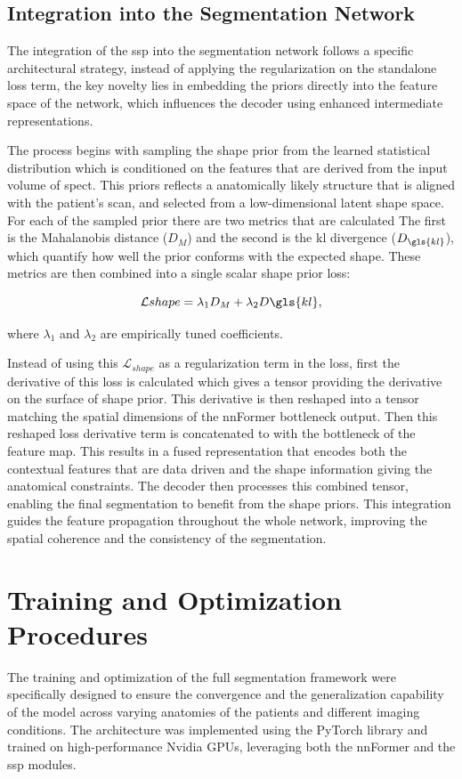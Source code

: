 \subsection{Integration into the Segmentation Network}
The integration of the \gls{ssp} into the segmentation network follows a specific architectural strategy, instead of applying the regularization on the standalone loss term, the key novelty lies in embedding the priors directly into the feature space of the network, which influences the decoder using enhanced intermediate representations. 

The process begins with sampling the shape prior from the learned statistical distribution which is conditioned on the features that are derived from the input volume of \gls{spect}. This priors reflects a anatomically likely structure that is aligned with the patient's scan, and selected from a low-dimensional latent shape space. For each of the sampled prior there are two metrics that are calculated The first is the Mahalanobis distance ($D_M$) and the second is the \gls{kl} divergence ($D_{\gls{kl}}$), which quantify how well the prior conforms with the expected shape. These metrics are then combined into a single scalar shape prior loss:

\begin{equation}
\addcontentsline{equ}{equations}{\protect\numberline{\theequation}Combined Shape Loss} 
\mathcal{L}{shape} = \lambda_1 D_M + \lambda_2 D{\gls{kl}}, 
\end{equation}

where $\lambda_1$ and $\lambda_2$ are empirically tuned coefficients.

Instead of using this $\mathcal{L}_{shape}$ as a regularization term in the loss, first the derivative of this loss is calculated which gives a tensor providing the derivative on the surface of shape prior. This derivative is then reshaped into a tensor matching the spatial dimensions of the nnFormer bottleneck output. Then this reshaped loss derivative term is concatenated to with the bottleneck of the feature map. This results in a fused representation that encodes both the contextual features that are data driven and the shape information giving the anatomical constraints. The decoder then processes this combined tensor, enabling the final segmentation to benefit from the shape priors. This integration guides the feature propagation throughout the whole network, improving the spatial coherence and the consistency of the segmentation.

\section{Training and Optimization Procedures}
The training and optimization of the full segmentation framework were specifically designed to ensure the convergence and the generalization capability of the model across varying anatomies of the patients and different imaging conditions. The architecture was implemented using the PyTorch library and trained on high-performance Nvidia GPUs, leveraging both the nnFormer and the \gls{ssp} modules.


